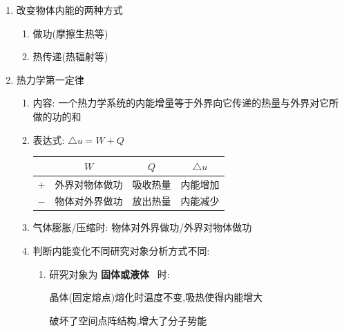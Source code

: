 \documentclass{article}
\begin{document}
\begin{enumerate}[label = \arabic*]
    \item 改变物体内能的两种方式
          \begin{enumerate}[label = (\arabic*)]
              \item 做功(摩擦生热等)
              \item 热传递(热辐射等)
          \end{enumerate}
    \item 热力学第一定律
          \begin{enumerate}[label = (\arabic*)]
              \item 内容: 一个热力学系统的内能增量等于外界向它传递的热量与外界对它所做的功的和
              \item 表达式: $ \triangle u = W + Q $

                    \begin{center}
                        \begin{tabular}{|c|c|c|c|}
                            \hline
                            \,  & $W$     & $Q$  & $\triangle u$ \\
                            \hline
                            $+$ & 外界对物体做功 & 吸收热量 & 内能增加          \\
                            \hline
                            $-$ & 物体对外界做功 & 放出热量 & 内能减少          \\
                            \hline
                        \end{tabular}
                    \end{center}

              \item 气体膨胀/压缩时: 物体对外界做功/外界对物体做功
              \item 判断内能变化不同研究对象分析方式不同:
                    \begin{enumerate}[label = (\alph*)]
                        \item 研究对象为 \textbf{固体或液体} \, 时:

                              \begin{minipage}{0.8\textwidth}
                                  晶体(固定熔点)熔化时温度不变,吸热使得内能增大

                                  \vspace{-1em}
                                  \hspace{-1em}\begin{adjustbox}{minipage=0.38\linewidth, bgcolor=gray!20, padding=1em}
                                      \small
                                      破坏了空间点阵结构,增大了分子势能
                                  \end{adjustbox}
                                  \vspace{-1em}


\end{minipage}
\end{enumerate}
\end{enumerate}
\end{enumerate}
\end{document}
